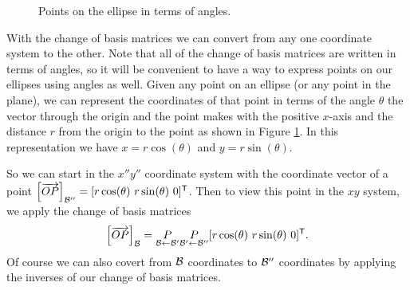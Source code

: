 \begin{figure}[h]
\begin{center}
\end{center}
\caption{Points on the ellipse in terms of angles.}
\label{F:ellipse_polar}
\end{figure}
With the change of basis matrices we can convert from any one coordinate system to the other. Note that all of the change of basis matrices are written in terms of angles, so it will be convenient to have a way to express points on our ellipses using angles as well. Given any point on an ellipse (or any point in the plane), we can represent the coordinates of that point in terms of the angle $\theta$ the vector through the origin and the point makes with the positive $x$-axis and the distance $r$ from the origin to the point as shown in Figure \ref{F:ellipse_polar}. In this representation we have $x = r\cos(\theta)$ and $y = r \sin(\theta)$. 

So we can start in the $x''y''$ coordinate system with the coordinate vector of a point $\left[\overrightarrow{OP}\right]_{\mathcal{B}''} = [ r\cos(\theta) \ r\sin(\theta) \ 0]^{\mathsf{T}}$. Then to view this point in the $xy$ system, we apply the change of basis matrices 
\[\left[\overrightarrow{OP}\right]_{\mathcal{B}} = \underset{\mathcal{B} \leftarrow \mathcal{B}'}{P} \underset{\mathcal{B}' \leftarrow \mathcal{B}''}{P} [ r\cos(\theta) \ r\sin(\theta) \ 0]^{\mathsf{T}}.\]
Of course we can also covert from $\mathcal{B}$ coordinates to $\mathcal{B}''$ coordinates by applying the inverses of our change of basis matrices. 



